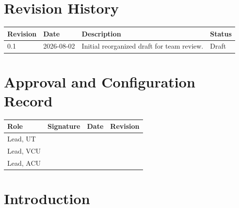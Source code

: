 \documentclass[11pt]{article}
\begin{document}
\clearpage
\hypersetup{pageanchor=true}


\section*{Revision History}
\begin{tabularx}{\textwidth}{@{}p{0.75in}p{1.2in}>{\raggedright\arraybackslash}X>{\raggedright\arraybackslash}p{1.15in}@{}}
\toprule
\textbf{Revision} & \textbf{Date} & \textbf{Description} & \textbf{Status} \\
\midrule

0.1 & 2026-08-02 & Initial reorganized draft for team review. & Draft \\
\bottomrule
\end{tabularx}

\vspace{0.25in}

\section*{Approval and Configuration Record}
\begin{tabularx}{\textwidth}{@{}p{1.55in}X p{1.25in}p{1.05in}@{}}
\toprule
\textbf{Role} & \textbf{Signature} & \textbf{Date} & \textbf{Revision} \\
\midrule
Lead, UT & & & \\
Lead, VCU & & & \\
Lead, ACU & & & \\
\bottomrule
\end{tabularx}

\clearpage
\tableofcontents
\clearpage
{}

\clearpage
\section{Introduction}
\end{document}
